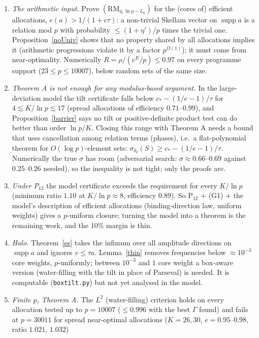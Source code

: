 \begin{enumerate}
\item[(G1)] \emph{The arithmetic input.}  Prove $(\mathrm{RM}_{\eta,\ln p-L_0})$ for the (cores of) efficient allocations, $e(a)>1/(1+c\tau)$: a non-trivial
Skellam vector on $\operatorname{supp}a$ is a relation mod $p$ with probability $\le(1+\eta')/p$ times the trivial one.  Proposition~\ref{noUniv}
shows that no property shared by all allocations implies it (arithmetic progressions violate it by a factor $p^{\Omega(1)}$); it must come from
near-optimality.  Numerically $R=\rho/(e^E/p)\le0.97$ on every programme support ($23\le p\le10007$), below random sets of the same size.
\item[(G2)] \emph{Theorem A is not enough for any modulus-based argument.}  In the large-deviation model the tilt certificate falls below
$c_*-(1/e-1)/\tau$ for $4\lesssim K/\ln p\lesssim17$ (spread allocations of efficiency $0.71$--$0.99$), and Proposition~\ref{barrier} says no tilt or
positive-definite product test can do better than order $\ln p/K$.  Closing this range with Theorem A needs a bound that uses cancellation among relation
terms (phases), i.e.\ a flat-polynomial theorem for $O(\log p)$-element sets: $\sigma_{\delta_0}(S)\ge c_*-(1/e-1)/\tau$.  Numerically the true $\sigma$ has room
(adversarial search: $\sigma\approx0.66$--$0.69$ against $0.25$--$0.26$ needed), so the inequality is not tight; only the proofs are.
\item[(G3)] \emph{Under P$_{12}$} the model certificate exceeds the requirement for every $K/\ln p$ (minimum ratio $1.10$ at $K/\ln p\approx8$, efficiency
$0.89$).  So P$_{12}$ $+$ (G1) $+$ the model's description of efficient allocations (binding-direction law, uniform weights) gives a $p$-uniform
closure; turning the model into a theorem is the remaining work, and the $10\%$ margin is thin.
\item[(G4)] \emph{Halo.}  Theorem~\ref{es} takes the infimum over all amplitude directions on $\operatorname{supp}a$ and ignores $v\le\tau a$.  Lemma~\ref{thin}
removes frequencies below $\approx10^{-3}$ core weights, $p$-uniformly; between $10^{-3}$ and $1$ core weight a box-aware version (water-filling with the tilt
in place of Parseval) is needed.  It is computable (\texttt{boxtilt.py}) but not yet analysed in the model.
\item[(G5)] \emph{Finite $p$, Theorem A.}  The $L^2$ (water-filling) criterion holds on every allocation tested up to $p=10007$
($\le0.996$ with the best $\Gamma$ found) and fails at $p=30011$ for spread near-optimal allocations ($K=26,30$, $e=0.95$--$0.98$, ratio $1.021$, $1.032$)

\end{enumerate}
